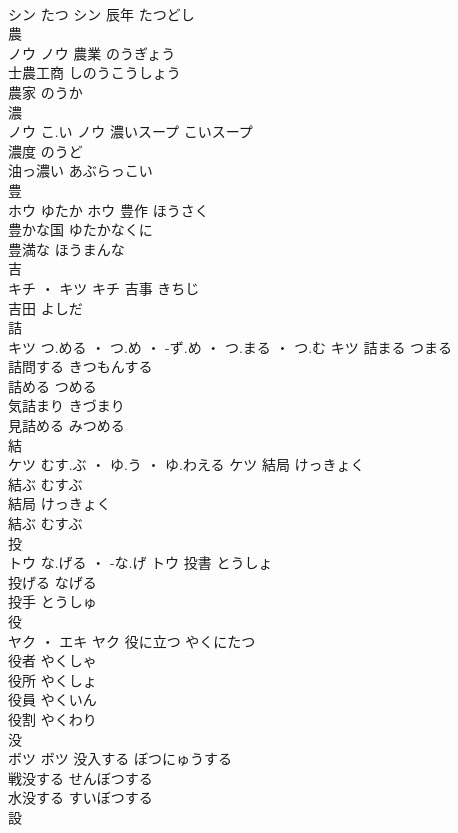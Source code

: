 \documentclass[8pt]{extreport}
\begin{document}
\begin{CJK}{UTF8}{min}
\\	シン	たつ	シン	辰年	たつどし	
\\	農	
\\	ノウ		ノウ	農業	のうぎょう	
\\	士農工商	しのうこうしょう	
\\	農家	のうか	
\\	濃	
\\	ノウ	こ.い	ノウ	濃いスープ	こいスープ	
\\	濃度	のうど	
\\	油っ濃い	あぶらっこい	
\\	豊	
\\	ホウ	ゆたか	ホウ	豊作	ほうさく	
\\	豊かな国	ゆたかなくに	
\\	豊満な	ほうまんな	
\\	吉	
\\	キチ ・ キツ		キチ	吉事	きちじ	
\\	吉田	よしだ	
\\	詰	
\\	キツ	つ.める ・ つ.め ・ -ず.め ・ つ.まる ・ つ.む	キツ	詰まる	つまる	
\\	詰問する	きつもんする	
\\	詰める	つめる	
\\	気詰まり	きづまり	
\\	見詰める	みつめる	
\\	結	
\\	ケツ	むす.ぶ ・ ゆ.う ・ ゆ.わえる	ケツ	結局	けっきょく	
\\	結ぶ	むすぶ	
\\	結局	けっきょく	
\\	結ぶ	むすぶ	
\\	投	
\\	トウ	な.げる ・ -な.げ	トウ	投書	とうしょ	
\\	投げる	なげる	
\\	投手	とうしゅ	
\\	役	
\\	ヤク ・ エキ		ヤク	役に立つ	やくにたつ	
\\	役者	やくしゃ	
\\	役所	やくしょ	
\\	役員	やくいん	
\\	役割	やくわり	
\\	没	
\\	ボツ		ボツ	没入する	ぼつにゅうする	
\\	戦没する	せんぼつする	
\\	水没する	すいぼつする	
\\	設	

\end{CJK}
\end{document}
